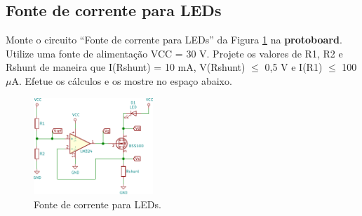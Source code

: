 \documentclass[addpoints]{exam}
\begin{document}
\begin{questions}

\section*{Fonte de corrente para LEDs}

\question Monte o circuito ``Fonte de corrente para LEDs'' da Figura \ref{cir:1} na \textbf{protoboard}. Utilize uma fonte de alimentação VCC = 30 V. Projete os valores de R1, R2 e Rshunt de maneira que I(Rshunt) = 10 mA, V(Rshunt) $\le$ 0,5 V e I(R1) $\le$ 100 $\mu$A. Efetue os cálculos e os mostre no espaço abaixo.
\label{part:a}

\begin{figure}[h!]
\begin{center}
\includegraphics[width=0.4\textwidth]{imagens/realimentacao.pdf}
\end{center}
\caption{Fonte de corrente para LEDs.}
\label{cir:1}
\end{figure}

\begin{framed}
\vspace{4cm}
\end{framed} 

\pagebreak

\end{questions}
\end{document}
